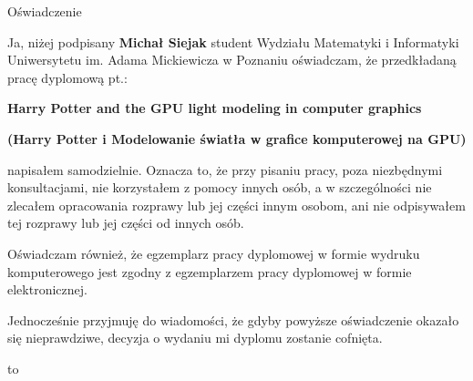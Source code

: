 \documentclass[oneside,openright,a4paper,12pt]{memoir}
\theoremstyle{definition}
\begin{document}
\begin{center}
  \LARGE{Oświadczenie}
\end{center}

Ja, niżej podpisany \textbf{Michał Siejak} student Wydziału
Matematyki i Informatyki Uniwersytetu im. Adama Mickiewicza w Poznaniu
oświadczam, że przedkładaną pracę dyplomową pt.:

\vspace{5pt}
\centerline{\textbf{Harry Potter and the GPU light modeling in computer graphics}}

\centerline{\textbf{(Harry Potter i Modelowanie światła w grafice komputerowej na GPU)}}
\vspace{5pt}

napisałem samodzielnie. Oznacza to, że przy pisaniu pracy, poza niezbędnymi
konsultacjami, nie korzystałem z pomocy innych osób, a w szczególności nie
zlecałem opracowania rozprawy lub jej części innym osobom, ani nie
odpisywałem tej rozprawy lub jej części od innych osób.

Oświadczam również, że egzemplarz pracy dyplomowej w formie wydruku
komputerowego jest zgodny z egzemplarzem pracy dyplomowej w formie
elektronicznej.

Jednocześnie przyjmuję do wiadomości, że gdyby powyższe oświadczenie
okazało się nieprawdziwe, decyzja o wydaniu mi dyplomu zostanie cofnięta.

\newcommand{\kropki}[2]{%
  \vbox{%
    \hbox to #1{\dotfill}%
    \vspace{4pt}%
    \hbox to #1{\hss #2\hss}%
  }
}
\vspace{1cm}
\hbox to \textwidth{%
  \hfil
  \kropki{4cm}{data}%
  \hfil\hfil
  \kropki{4cm}{podpis}%
  \hfil
}
\newpage

\begingroup
\setlength{\beforechapskip}{0pt}
\tableofcontents*
\endgroup

\mainmatter

%


%



\backmatter
\printbibliography
\end{document}
